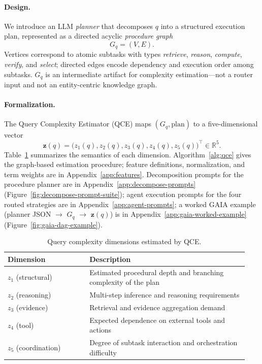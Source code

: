 \paragraph{Design.}
We introduce an LLM \emph{planner} that decomposes $q$ into a structured execution plan,
represented as a directed acyclic \emph{procedure graph}
\begin{equation}
  G_q=(V,E).
  \label{eq:method-procedure-graph}
\end{equation}
Vertices correspond to atomic subtasks with types \emph{retrieve}, \emph{reason},
\emph{compute}, \emph{verify}, and \emph{select}; directed edges encode dependency and
execution order among subtasks.
$G_q$ is an intermediate artifact for complexity estimation---not a router input and not
an entity-centric knowledge graph.

\paragraph{Formalization.}
The Query Complexity Estimator (QCE) maps $(G_q,\text{plan})$ to a five-dimensional vector
\begin{equation}
  \mathbf{z}(q)=\bigl(z_1(q), z_2(q), z_3(q), z_4(q), z_5(q)\bigr)^\top\in\mathbb{R}^5.
  \label{eq:method-complexity-vector}
\end{equation}
Table~\ref{tab:complexity-dims} summarizes the semantics of each dimension.
Algorithm~\ref{alg:qce} gives the graph-based estimation procedure; feature definitions,
normalization, and term weights are in Appendix~\ref{app:features}.
Decomposition prompts for the procedure planner are in Appendix~\ref{app:decompose-prompts}
(Figure~\ref{fig:decompose-prompt-suite});
agent execution prompts for the four routed strategies are in Appendix~\ref{app:agent-prompts};
a worked GAIA example (planner JSON $\rightarrow$ $G_q$ $\rightarrow$ $\mathbf{z}(q)$) is in
Appendix~\ref{app:gaia-worked-example} (Figure~\ref{fig:gaia-dag-example}).

\begin{table}[t]
  \centering
  \footnotesize
  \setlength{\tabcolsep}{3pt}
  \caption{Query complexity dimensions estimated by QCE.}
  \label{tab:complexity-dims}
  \begin{tabular}{@{}p{0.32\linewidth}p{0.62\linewidth}@{}}
    \toprule
    Dimension & Description \\
    \midrule
    $z_1$ (structural) &
      Estimated procedural depth and branching complexity of the plan \\
    $z_2$ (reasoning) &
      Multi-step inference and reasoning requirements \\
    $z_3$ (evidence) &
      Retrieval and evidence aggregation demand \\
    $z_4$ (tool) &
      Expected dependence on external tools and actions \\
    $z_5$ (coordination) &
      Degree of subtask interaction and orchestration difficulty \\
    \bottomrule
  \end{tabular}
\end{table}

